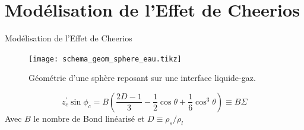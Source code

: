 \documentclass[aspectratio=169,xcolor=dvipsnames]{beamer}
\begin{document}
\section{Modélisation de l'Effet de Cheerios}

\begin{frame}{Modélisation de l'Effet de Cheerios\cite{vella_cheerios_2005}}
    \centering
    \begin{figure}
        \centering
        \texttt{[image: schema\_geom\_sphere\_eau.tikz]}
        \caption{Géométrie d'une sphère reposant sur une interface liquide-gaz.}
        \label{geom_sphere}
    \end{figure} 
    \[z_c^{'}\sin \phi_c = B\left(\frac{2D-1}{3}-\frac{1}{2}\cos \theta + \frac{1}{6} \cos^3 \theta\right) \equiv B\Sigma\]
    Avec $B$ le nombre de Bond linéarisé et $D \equiv \rho_s / \rho_l$
\end{frame}
\end{document}
